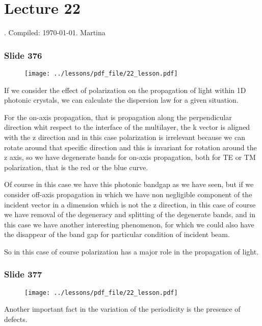 \documentclass[../main/main.tex]{subfiles}
\begin{document}
\section{Lecture 22}
 . Compiled:  \today. Martina 

\subsubsection{Slide 376}

\begin{figure}[h!]
\centering
\texttt{[image: ../lessons/pdf\_file/22\_lesson.pdf]}
\end{figure}


If we consider the effect of polarization on the propagation of light within 1D photonic crystals, we can calculate the dispersion law for a given situation.

For the on-axis propagation, that is propagation along the perpendicular direction whit respect to the interface of the multilayer, the k vector is aligned with the z direction and in this case polarization is irrelevant because we can rotate around that specific direction and this is invariant for rotation around the z axis, so we have degenerate bands for on-axis propagation, both for TE or TM polarization, that is the red or the blue curve.

Of course in this case we have this photonic bandgap as we have seen, but if we consider off-axis propagation in which we have non negligible component of the incident vector in a dimension which is not the z direction, in this case of course we have removal of the degeneracy and splitting of the degenerate bands, and in this case we have another interesting phenomenon, for which we could also have the disappear of the band gap for particular condition of incident beam. 

So in this case of course polarization has a major role in the propagation of light.

\newpage


\subsubsection{Slide 377}
 
 \begin{figure}[h!]
\centering
\texttt{[image: ../lessons/pdf\_file/22\_lesson.pdf]}
\end{figure}

Another important fact in the variation of the periodicity is the presence of defects. 
\end{document}
